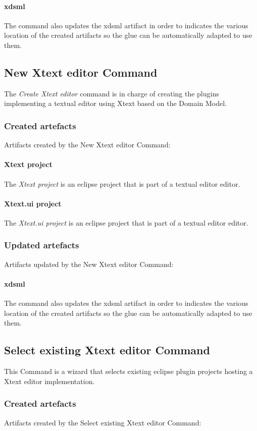 \documentclass{gemoc} %
\begin{document}
\paragraph{xdsml} 
The command also updates the xdsml artifact in order to indicates the various location of the created artifacts so the glue can be automatically adapted to use them.

\subsection{New Xtext editor Command}
The \emph{Create Xtext editor} command is in charge of creating the plugins implementing a textual editor using Xtext based on the Domain Model.
\subsubsection{Created artefacts}
Artifacts created by the New Xtext editor Command:
\paragraph{Xtext project} 
The \emph{Xtext project} is an eclipse project that is part of a textual editor editor.\paragraph{Xtext.ui project} 
The \emph{Xtext.ui project} is an eclipse project that is part of a textual editor editor.
\subsubsection{Updated artefacts}
Artifacts updated by the New Xtext editor Command:
\paragraph{xdsml} 
The command also updates the xdsml artifact in order to indicates the various location of the created artifacts so the glue can be automatically adapted to use them.

\subsection{Select existing Xtext editor Command}
This Command is a wizard that selects existing eclipse plugin projects hosting a Xtext editor implementation.
\subsubsection{Created artefacts}
Artifacts created by the Select existing Xtext editor Command:
\end{document}
